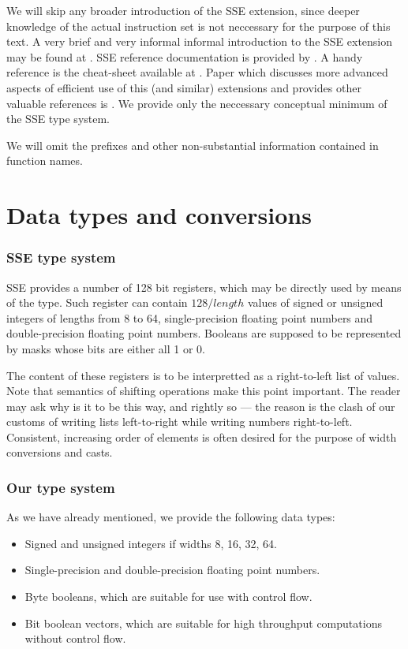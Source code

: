 We will skip any broader introduction of the SSE extension, since deeper knowledge of the actual instruction set is not neccessary for the purpose of this text. A very brief and very informal informal introduction to the SSE extension may be found at \cite{ssetut}. SSE reference documentation is provided by \cite{reference}. A handy reference is the cheat-sheet available at \cite{cheats}. Paper which discusses more advanced aspects of efficient use of this (and similar) extensions and provides other valuable references is \cite{autotuning}. We provide only the neccessary conceptual minimum of the SSE type system.

We will omit the  prefixes and other non-substantial information contained in function names.

\section{Data types and conversions} 

\subsubsection{SSE type system}

SSE provides a number of 128 bit registers, which may be directly used by means of the  type. Such register can contain $128/length$ values of signed or unsigned integers of lengths from 8 to 64, single-precision floating point numbers and double-precision floating point numbers. Booleans are supposed to be represented by masks whose bits are either all 1 or 0.

The content of these registers is to be interpretted as a right-to-left list of values. Note that semantics of shifting operations make this point important. The reader may ask why is it to be this way, and rightly so --- the reason is the clash of our customs of writing lists left-to-right while writing numbers right-to-left. Consistent, increasing order of elements is often desired for the purpose of width conversions and casts.

\subsubsection{Our type system}

As we have already mentioned, we provide the following data types:
\begin{itemize}
\item Signed and unsigned integers if widths 8, 16, 32, 64.
\item Single-precision and double-precision floating point numbers.
\item Byte booleans, which are suitable for use with control flow.
\item Bit boolean vectors, which are suitable for high throughput computations without control flow.
\end{itemize}


